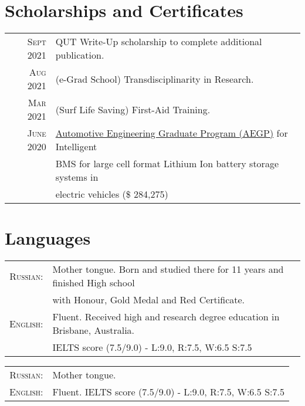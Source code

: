 \documentclass[a4paper,12pt]{article}
\begin{document}
%
%
{
    {
\section{Scholarships and Certificates}
\begin{tabular}{rl}
 \textsc{Sept} 2021 & QUT Write-Up scholarship to complete additional publication. \\
 \textsc{Aug} 2021 & (e-Grad School) Transdisciplinarity in Research. \\
 \textsc{Mar} 2021 & (Surf Life Saving) First-Aid Training. \\
 \textsc{June} 2020 & 
 \href{https://business.gov.au/grants-and-programs/automotive-engineering-graduate-program/aegp-grant-recipients}{Automotive Engineering Graduate Program (AEGP)} for Intelligent \\
 & BMS for large cell format Lithium Ion battery storage systems in \\
 & electric vehicles \footnotesize(\$ 284,275)\normalsize\\
 
%  
\end{tabular}
    } {}
\section{Languages}
    {
\begin{tabular}{rl}
	\textsc{Russian:} &Mother tongue. 
	Born and studied there for 11 years and finished High school \\ 
	& with Honour, Gold Medal and Red Certificate. \\ [1pc]
	\textsc{English:} &Fluent. Received high and research degree education in Brisbane, Australia. \\
	& IELTS score (7.5/9.0) - L:9.0, R:7.5, W:6.5 S:7.5
\end{tabular}
    }
    {
\begin{tabular}{rl}
	\textsc{Russian:} & Mother tongue. \\
	\textsc{English:} &Fluent. IELTS score (7.5/9.0) - L:9.0, R:7.5, W:6.5 S:7.5
\end{tabular}
    }
    {
}}
\end{document}
